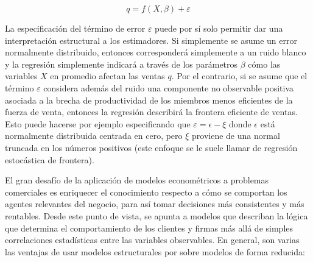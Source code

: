 \documentclass[
]{book}
\begin{document}
\[q=f(X,\beta)+\varepsilon\]

La especificación del término de error \(\varepsilon\) puede por sí solo permitir dar una interpretación estructural a los estimadores. Si simplemente se asume un error normalmente distribuido, entonces corresponderá simplemente a un ruido blanco y la regresión simplemente indicará a través de los parámetros \(\beta\) cómo las variables \(X\) en promedio afectan las ventas \(q\). Por el contrario, si se asume que el término \(\varepsilon\) considera además del ruido una componente no observable positiva asociada a la brecha de productividad de los miembros menos eficientes de la fuerza de venta, entonces la regresión describirá la frontera eficiente de ventas. Esto puede hacerse por ejemplo especificando que \(\varepsilon = \epsilon - \xi\) donde \(\epsilon\) está normalmente distribuida centrada en cero, pero \(\xi\) proviene de una normal truncada en los números positivos (este enfoque se le suele llamar de regresión estocástica de frontera).

El gran desafío de la aplicación de modelos econométricos a problemas comerciales es enriquecer el conocimiento respecto a cómo se comportan los agentes relevantes del negocio, para así tomar decisiones más consistentes y más rentables. Desde este punto de vista, se apunta a modelos que describan la lógica que determina el comportamiento de los clientes y firmas más allá de simples correlaciones estadísticas entre las variables observables. En general, son varias las ventajas de usar modelos estructurales por sobre modelos de forma reducida:
\end{document}
